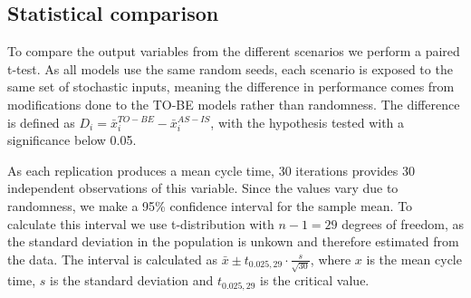 

\subsection{Statistical comparison}

To compare the output variables from the different scenarios we perform a paired t-test. As all models use the same random seeds, each scenario is exposed to the same set of stochastic inputs, meaning the difference in performance comes from modifications done to the TO-BE models rather than randomness. The difference is defined as $D_i = \bar{x}_i^{TO-BE} - \bar{x}_i^{AS-IS}$, with the hypothesis tested with a significance below 0.05.

As each replication produces a mean cycle time, 30 iterations provides 30 independent observations of this variable. Since the values vary due to randomness, we make a 95\% confidence interval for the sample mean. To calculate this interval we use t-distribution with $n - 1 = 29$ degrees of freedom, as the standard deviation in the population is unkown and therefore estimated from the data. The interval is calculated as $\bar{x} \pm t_{0.025,29} \cdot \frac{s}{\sqrt{30}}$, where $x$ is the mean cycle time, $s$ is the standard deviation and $t_{0.025,29}$ is the critical value. 

